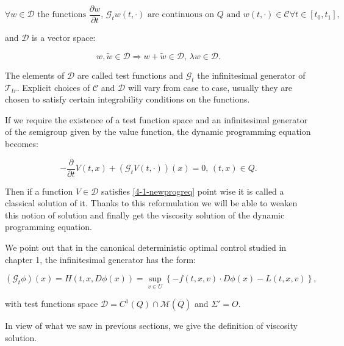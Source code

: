 \begin{equation}\label{4-1-conditiononD}
    \forall w\in\mathcal{D} \text{ the functions }\frac{\partial w}{\partial t},\,\mathcal{G}_tw(t,\cdot) \text{ are continuous on $Q$ and }w(t,\cdot)\in\mathcal{C} \forall t\in[t_0,t_1], 
\end{equation}

and $\mathcal{D}$ is a vector space:

\begin{equation}
    w,\tilde{w}\in\mathcal{D} \Rightarrow w+\tilde{w}\in\mathcal{D},\,\lambda w\in\mathcal{D}.
\end{equation}

The elements of $\mathcal{D}$ are called test functions and $\mathcal{G}_t$ the infinitesimal generator of $\mathcal{T}_{tr}$. Explicit choices of $\mathcal{C}$ and 
$\mathcal{D}$ will vary from case to case, usually they are chosen to satisfy certain integrability conditions on the functions. 

If we require the existence of a test function space and an infinitesimal generator of the semigroup given by the value function, the 
dynamic programming equation becomes:

\begin{equation}\label{4-1-newprogreq}
    -\frac{\partial }{\partial t}V(t,x) + (\mathcal{G}_tV(t,\cdot))(x) = 0,\,(t,x)\in Q.
\end{equation}

Then if a function $V\in\mathcal{D}$ satisfies \ref{4-1-newprogreq} point wise it is called a classical solution of it. Thanks to this reformulation we will be able 
to weaken this notion of solution and finally get the viscosity solution of the dynamic programming equation.

We point out that in the canonical deterministic optimal control studied in chapter 1, the infinitesimal generator has the form:

\[(\mathcal{G}_t\phi)(x) = H(t,x,D\phi(x)) = \sup_{v \in U}\left\{-f(t,x,v)\cdot D\phi(x) - L(t,x,v)\right\},\]

with test functions space $\mathcal{D}= C^1(Q)\cap \mathcal{M}(\overline{Q})$ and $\Sigma'=O$.

In view of what we saw in previous sections, we give the definition of viscosity solution. 

